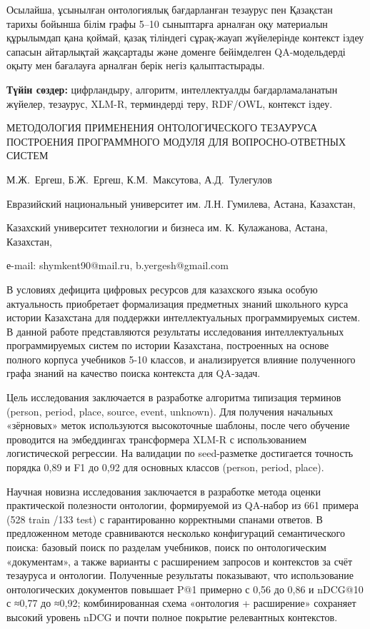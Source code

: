 Осылайша, ұсынылған онтологиялық бағдарланған тезаурус пен Қазақстан
тарихы бойынша білім графы 5--10 сыныптарға арналған оқу материалын
құрылымдап қана қоймай, қазақ тіліндегі сұрақ-жауап жүйелерінде контекст
іздеу сапасын айтарлықтай жақсартады және доменге бейімделген
QA-модельдерді оқыту мен бағалауға арналған берік негіз қалыптастырады.

{\bfseries Түйін сөздер:} цифрландыру, алгоритм, интеллектуалды
бағдарламаланатын жүйелер, тезаурус, XLM-R, терминдерді теру, RDF/OWL,
контекст іздеу.

\begin{header}
МЕТОДОЛОГИЯ ПРИМЕНЕНИЯ ОНТОЛОГИЧЕСКОГО ТЕЗАУРУСА ПОСТРОЕНИЯ ПРОГРАММНОГО МОДУЛЯ ДЛЯ ВОПРОСНО-ОТВЕТНЫХ СИСТЕМ

М.Ж.~Ергеш\envelope,
Б.Ж.~Ергеш\envelope,
К.М.~Максутова,
А.Д.~Тулегулов
\end{header}

\begin{affil}
Евразийский национальный университет им. Л.Н. Гумилева, Астана, Казахстан,

Казахский университет технологии и бизнеса им. К. Кулажанова, Астана, Казахстан,

е-mail: shymkent90@mail.ru, b.yergesh@gmail.com
\end{affil}

В условиях дефицита цифровых ресурсов для казахского языка особую
актуальность приобретает формализация предметных знаний школьного курса
истории Казахстана для поддержки интеллектуальных программируемых
систем. В данной работе представляются результаты исследования
интеллектуальных программируемых систем по истории Казахстана,
построенных на основе полного корпуса учебников 5-10 классов, и
анализируется влияние полученного графа знаний на качество поиска
контекста для QA-задач.

Цель исследования заключается в разработке алгоритма типизация терминов
(person, period, place, source, event, unknown). Для получения начальных
«зёрновых» меток используются высокоточные шаблоны, после чего обучение
проводится на эмбеддингах трансформера XLM-R с использованием
логистической регрессии. На валидации по seed-разметке достигается
точность порядка 0,89 и F1 до 0,92 для основных классов (person, period,
place).

Научная новизна исследования заключается в разработке метода оценки
практической полезности онтологии, формируемой из QA-набор из 661
примера (528 train /133 test) с гарантированно корректными спанами
ответов. В предложенном методе сравниваются несколько конфигураций
семантического поиска: базовый поиск по разделам учебников, поиск по
онтологическим «документам», а также варианты с расширением запросов и
контекстов за счёт тезауруса и онтологии. Полученные результаты
показывают, что использование онтологических документов повышает P@1
примерно с 0,56 до 0,86 и nDCG@10 с ≈0,77 до ≈0,92; комбинированная
схема «онтология + расширение» сохраняет высокий уровень nDCG и почти
полное покрытие релевантных контекстов.

